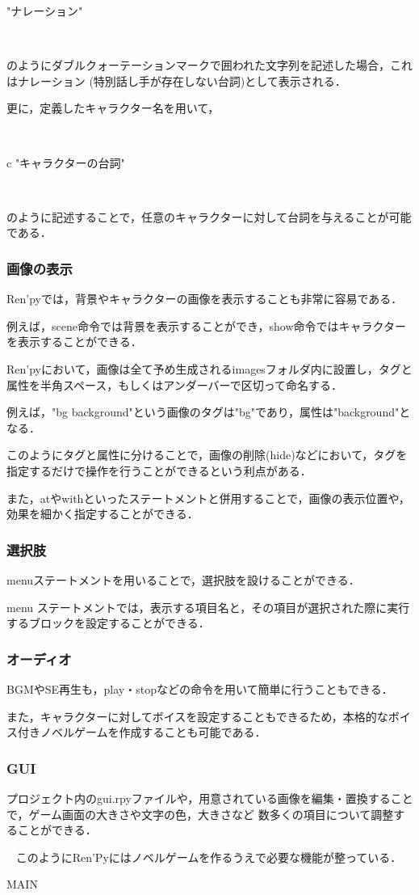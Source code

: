 \documentclass[a4paper]{jarticle}
\begin{document}
    "ナレーション"

    ~

    のようにダブルクォーテーションマークで囲われた文字列を記述した場合，これはナレーション
    (特別話し手が存在しない台詞)として表示される．

    更に，定義したキャラクター名を用いて，

    ~

    c "キャラクターの台詞"

    ~

    のように記述することで，任意のキャラクターに対して台詞を与えることが可能である．

  \subsubsection{画像の表示}

    Ren'pyでは，背景やキャラクターの画像を表示することも非常に容易である．

    例えば，scene命令では背景を表示することができ，show命令ではキャラクターを表示することができる．
    
    Ren'pyにおいて，画像は全て予め生成されるimagesフォルダ内に設置し，タグと属性を半角スペース，もしくはアンダーバーで区切って命名する．

    例えば，"bg background"という画像のタグは"bg"であり，属性は"background"となる．

    このようにタグと属性に分けることで，画像の削除(hide)などにおいて，タグを指定するだけで操作を行うことができるという利点がある．

    また，atやwithといったステートメントと併用することで，画像の表示位置や，効果を細かく指定することができる．

  \subsubsection{選択肢}

    menuステートメントを用いることで，選択肢を設けることができる．
    
    menu ステートメントでは，表示する項目名と，その項目が選択された際に実行するブロックを設定することができる．

  \subsubsection{オーディオ}

    BGMやSE再生も，play・stopなどの命令を用いて簡単に行うこともできる．

    また，キャラクターに対してボイスを設定することもできるため，本格的なボイス付きノベルゲームを作成することも可能である．

  \subsubsection{GUI}

    プロジェクト内のgui.rpyファイルや，用意されている画像を編集・置換することで，ゲーム画面の大きさや文字の色，大きさなど
    数多くの項目について調整することができる．

  ~
  ​
  このようにRen'Pyにはノベルゲームを作るうえで必要な機能が整っている．

\expandafter\ifx\csname MAIN \endcsname\relax
  
\end{document}
